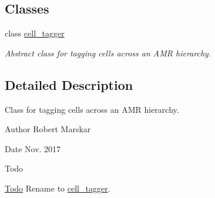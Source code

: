 \subsection*{Classes}
\begin{DoxyCompactItemize}
\item 
class \hyperlink{classcell__tagger}{cell\+\_\+tagger}
\begin{DoxyCompactList}\small\item\em Abstract class for tagging cells across an A\+MR hierarchy. \end{DoxyCompactList}\end{DoxyCompactItemize}


\subsection{Detailed Description}
Class for tagging cells across an A\+MR hierarchy. 

\begin{DoxyAuthor}{Author}
Robert Marskar 
\end{DoxyAuthor}
\begin{DoxyDate}{Date}
Nov. 2017 
\end{DoxyDate}
\begin{DoxyRefDesc}{Todo}
\item[\hyperlink{todo__todo000010}{Todo}]Rename to \hyperlink{classcell__tagger}{cell\+\_\+tagger}. \end{DoxyRefDesc}
